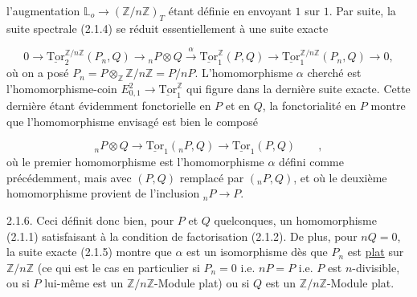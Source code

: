  l'augmentation $\mathbb{L}_o \longrightarrow (\mathbb{Z}/n\mathbb{Z})_T$ étant définie en envoyant $1$ sur $1$. Par suite, la suite spectrale (2.1.4) se réduit essentiellement à une suite exacte

\begin{equation}\tag{2.1.5}
0 \to \underline{\mathrm{Tor}}_2^{\mathbb{Z}/n\mathbb{Z}}(P_n,Q) \to {}_nP \otimes Q \stackrel{\alpha}{\longrightarrow} \underline{\mathrm{Tor}}_1^{\mathbb{Z}}(P,Q) \longrightarrow \underline{\mathrm{Tor}}_1^{\mathbb{Z}/n\mathbb{Z}}(P_n,Q) \to 0,
\end{equation}
où on a posé $P_n = P\otimes_{\mathbb{Z}} \mathbb{Z}/n\mathbb{Z} = P/nP$. L'homomorphisme $\alpha$ cherché est l'homomorphisme-coin $E^2_{0,1} \longrightarrow \underline{\mathrm{Tor}}_1^{\mathbb{Z}}$ qui figure dans la dernière suite exacte. Cette dernière étant évidemment fonctorielle en $P$ et en $Q$, la fonctorialité en $P$ montre que l'homomorphisme envisagé est bien le composé

\begin{equation*}
{}_nP \otimes Q \longrightarrow \underline{\mathrm{Tor}}_1({}_nP,Q) \longrightarrow \underline{\mathrm{Tor}}_1(P,Q) \qquad ,
\end{equation*}
où le premier homomorphisme est l'homomorphisme $\alpha$ défini comme précédemment, mais avec $(P,Q)$ remplacé par $({}_nP,Q)$, et où le deuxième homomorphisme provient de l'inclusion ${}_nP \longrightarrow P$.

2.1.6. Ceci définit donc bien, pour $P$ et $Q$ quelconques, un homomorphisme (2.1.1) satisfaisant à la condition de factorisation (2.1.2). De plus, pour $nQ=0$, la suite exacte (2.1.5) montre que $\alpha$ est un isomorphisme dès que $P_n$ est \underline{plat} sur $\mathbb{Z}/n\mathbb{Z}$ (ce qui est le cas en particulier si $P_n = 0$ i.e. $nP=P$ i.e. $P$ est $n$-divisible, ou si $P$ lui-même est un $\mathbb{Z}/n\mathbb{Z}$-Module plat) ou si $Q$ est un $\mathbb{Z}/n\mathbb{Z}$-Module plat.

